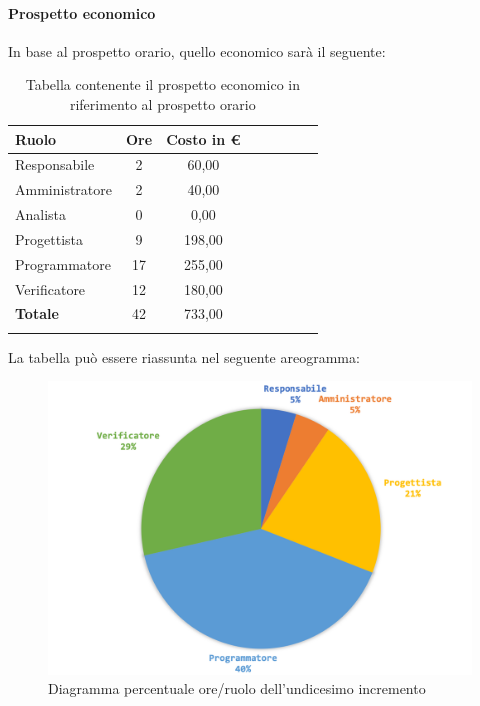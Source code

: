 		\paragraph{Prospetto economico}
		In base al prospetto orario, quello economico sarà il seguente: 
		
		\begin{longtable}{|l|c|c|c|c|c|c|c|}
			\hline
			\rowcolor{lighter-grayer}
			\textbf{Ruolo} & \textbf{Ore} & \textbf{Costo in € } \\
			\hline
			\endfirsthead
			
			\hline
			Responsabile 	    & 2 & 60,00\\
			\hline 
			\hline
			Amministratore	   & 2 & 40,00\\
			\hline
			\hline
			Analista 				& 0 & 0,00\\
			\hline
			\hline
			Progettista 		   & 9 & 198,00\\
			\hline
			\hline
			Programmatore 	  & 17 & 255,00\\
			\hline
			\hline
			Verificatore 		   & 12 & 180,00\\
			\hline
			\textbf{Totale} 	 & 42 & 733,00\\
			\hline
			\caption{Tabella contenente il prospetto economico in riferimento al prospetto orario}
		\end{longtable}
		
		La tabella può essere riassunta nel seguente areogramma:
		\begin{figure}[H]
			\centering
			\includegraphics[width=0.8\linewidth]{./images/preventivo/incremento11-2.png}
			\caption{Diagramma percentuale ore/ruolo dell'undicesimo incremento}
			\label{fig:diagramma costi ruolo incremento XI }
		\end{figure}
		\pagebreak
		

